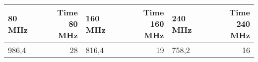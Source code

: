 \begin{tabular}{lrlrlr}
    \toprule
    80 MHz & \specialcell{Time                           \\ 80 MHz} & 160 MHz &  \specialcell{Time \\ 160 MHz}  & 240 MHz &  \specialcell{Time \\ 240 MHz} \\
    \midrule
    986,4  & 28                & 816,4 & 19 & 758,2 & 16 \\
    \bottomrule
\end{tabular}
